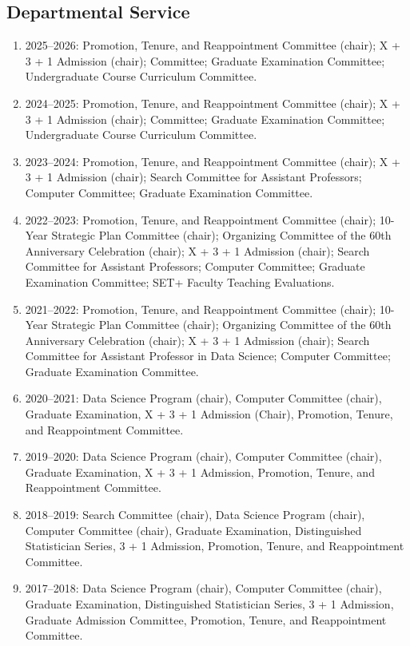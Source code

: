 \documentclass[Statistics]{vita}
\begin{document}
\begin{vita}
  \subsection{Departmental Service}
  \begin{enumerate}
  \item 2025--2026: Promotion, Tenure, and Reappointment Committee (chair); X + 3 + 1 Admission (chair); Committee; Graduate Examination Committee; Undergraduate Course Curriculum Committee.
  \item 2024--2025: Promotion, Tenure, and Reappointment Committee (chair); X + 3 + 1 Admission (chair); Committee; Graduate Examination Committee; Undergraduate Course Curriculum Committee.
 \item 2023--2024: Promotion, Tenure, and Reappointment Committee (chair); X + 3 + 1 Admission (chair); Search Committee for Assistant Professors; Computer Committee; Graduate Examination Committee.
  \item 2022--2023: Promotion, Tenure, and Reappointment Committee (chair); 10-Year Strategic Plan Committee (chair); Organizing Committee of the 60th Anniversary Celebration (chair); X + 3 + 1 Admission (chair); Search Committee for Assistant Professors; Computer Committee; Graduate Examination Committee; SET+ Faculty Teaching Evaluations.
  \item 2021--2022: Promotion, Tenure, and Reappointment Committee (chair); 10-Year Strategic Plan Committee (chair); Organizing Committee of the 60th Anniversary Celebration (chair); X + 3 + 1 Admission (chair); Search Committee for Assistant Professor in Data Science; Computer Committee; Graduate Examination Committee. 
  \item 2020--2021: Data Science Program (chair), Computer Committee (chair), Graduate Examination,  X + 3 + 1 Admission (Chair), Promotion, Tenure, and Reappointment Committee.
  \item 2019--2020: Data Science Program (chair), Computer Committee (chair), Graduate Examination,  X + 3 + 1 Admission, Promotion, Tenure, and Reappointment Committee.
  \item 2018--2019: Search Committee (chair), Data Science Program (chair), Computer Committee (chair), Graduate Examination, Distinguished Statistician Series, 3 + 1 Admission, Promotion, Tenure, and Reappointment Committee.
  \item 2017--2018: Data Science Program (chair), Computer Committee (chair), Graduate Examination, Distinguished Statistician Series, 3 + 1 Admission, Graduate Admission Committee, Promotion, Tenure, and Reappointment Committee.

\end{enumerate}
\end{vita}
\end{document}
